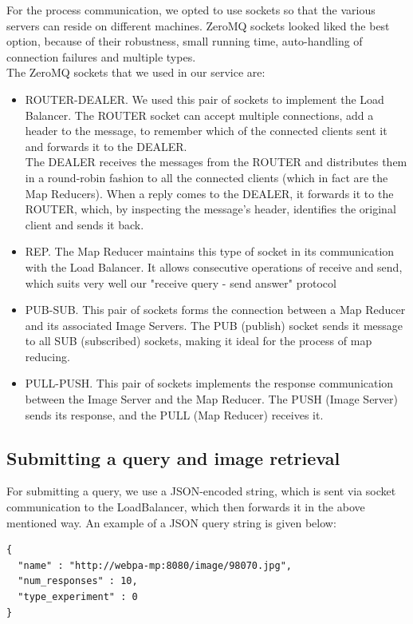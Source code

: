 For the process communication, we opted to use sockets so that the various servers can reside on different machines. ZeroMQ sockets \cite{zeromq} looked liked the best option, because of their robustness, small running time, auto-handling of connection failures and multiple types.\\
The ZeroMQ sockets that we used in our service are:
\begin{itemize}
	\item ROUTER-DEALER. We used this pair of sockets to implement the Load Balancer. The ROUTER socket can accept multiple connections, add a header to the message, to remember which of the connected clients sent it and forwards it to the DEALER.\\
	The DEALER receives the messages from the ROUTER and distributes them in a round-robin fashion to all the connected clients (which in fact are the Map Reducers). When a reply comes to the DEALER, it forwards it to the ROUTER, which, by inspecting the message's header, identifies the original client and sends it back.
	\item REP. The Map Reducer maintains this type of socket in its communication with the Load Balancer. It allows consecutive operations of receive and send, which suits very well our "receive query - send answer" protocol
	\item PUB-SUB. This pair of sockets forms the connection between a Map Reducer and its associated Image Servers.
	The PUB (publish) socket sends it message to all SUB (subscribed) sockets, making it ideal for the process of map reducing.
	\item PULL-PUSH. This pair of sockets implements the response communication between the Image Server and the Map Reducer. The PUSH (Image Server) sends its response, and the PULL (Map Reducer) receives it.
\end{itemize}

\subsection{Submitting a query and image retrieval}

For submitting a query, we use a JSON-encoded string, which is sent via socket communication to the LoadBalancer, which then forwards it in the above mentioned way. An example of a JSON query string is given below:

\begin{lstlisting}[caption=Query JSON]
{
  "name" : "http://webpa-mp:8080/image/98070.jpg",
  "num_responses" : 10,
  "type_experiment" : 0
}
\end{lstlisting}

